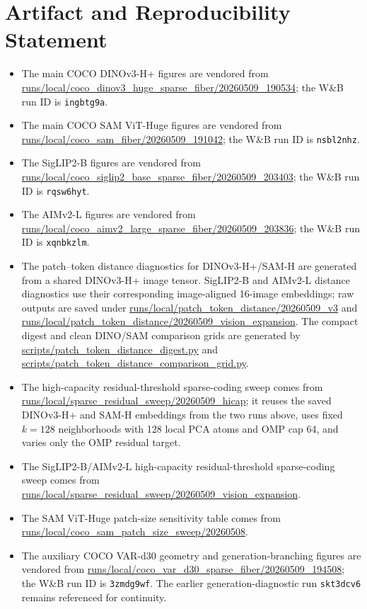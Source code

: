 \documentclass{article}
\newcommand{\dataset}[1]{\textsc{#1}}
\begin{document}
\section{Artifact and Reproducibility Statement}
\begin{itemize}[leftmargin=1.5em]
\item The main \dataset{COCO} DINOv3-H+ figures are vendored from \url{runs/local/coco_dinov3_huge_sparse_fiber/20260509_190534}; the W\&B run ID is \texttt{ingbtg9a}.
\item The main \dataset{COCO} SAM ViT-Huge figures are vendored from \url{runs/local/coco_sam_fiber/20260509_191042}; the W\&B run ID is \texttt{nsbl2nhz}.
\item The SigLIP2-B figures are vendored from \url{runs/local/coco_siglip2_base_sparse_fiber/20260509_203403}; the W\&B run ID is \texttt{rqsw6hyt}.
\item The AIMv2-L figures are vendored from \url{runs/local/coco_aimv2_large_sparse_fiber/20260509_203836}; the W\&B run ID is \texttt{xqnbkzlm}.
\item The patch--token distance diagnostics for DINOv3-H+/SAM-H are generated from a shared DINOv3-H+ image tensor. SigLIP2-B and AIMv2-L distance diagnostics use their corresponding image-aligned 16-image embeddings; raw outputs are saved under \url{runs/local/patch_token_distance/20260509_v3} and \url{runs/local/patch_token_distance/20260509_vision_expansion}. The compact digest and clean DINO/SAM comparison grids are generated by \url{scripts/patch_token_distance_digest.py} and \url{scripts/patch_token_distance_comparison_grid.py}.
\item The high-capacity residual-threshold sparse-coding sweep comes from \url{runs/local/sparse_residual_sweep/20260509_hicap}; it reuses the saved DINOv3-H+ and SAM-H embeddings from the two runs above, uses fixed $k=128$ neighborhoods with 128 local PCA atoms and OMP cap 64, and varies only the OMP residual target.
\item The SigLIP2-B/AIMv2-L high-capacity residual-threshold sparse-coding sweep comes from \url{runs/local/sparse_residual_sweep/20260509_vision_expansion}.
\item The SAM ViT-Huge patch-size sensitivity table comes from \url{runs/local/coco_sam_patch_size_sweep/20260508}.
\item The auxiliary \dataset{COCO} VAR-d30 geometry and generation-branching figures are vendored from \url{runs/local/coco_var_d30_sparse_fiber/20260509_194508}; the W\&B run ID is \texttt{3zmdg9wf}. The earlier generation-diagnostic run \texttt{skt3dcv6} remains referenced for continuity.

\end{itemize}
\end{document}
